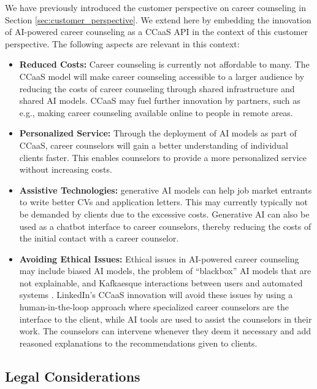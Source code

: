 We have previously introduced the customer perspective on career counseling in Section \ref{sec:customer_perspective}.
We extend here by embedding the innovation of AI-powered career counseling as a CCaaS API in the context of this 
customer perspective. The following aspects are relevant in this context:

\begin{itemize}
    \item \textbf{Reduced Costs:} Career counseling is currently not affordable to many. The CCaaS model
        will make career counseling accessible to a larger audience by reducing the costs of career
        counseling through shared infrastructure and shared AI models. CCaaS may fuel further innovation by 
        partners, such as e.g., making career counseling available online to people in remote areas.
    \item \textbf{Personalized Service:} Through the deployment of AI models as part of CCaaS, career counselors 
        will gain a better understanding of individual clients faster. This enables counselors to provide
        a more personalized service without increasing costs.
    \item \textbf{Assistive Technologies:} generative AI models can help job market entrants to write better CVs
        and application letters. This may currently typically not be demanded by clients due to the excessive costs.
        Generative AI can also be used as a chatbot interface to career counselors, thereby reducing the costs
        of the initial contact with a career counselor.
    \item \textbf{Avoiding Ethical Issues:} Ethical issues in AI-powered career counseling may include biased AI
        models, the problem of ``blackbox'' AI models that are not explainable, and Kafkaesque interactions between
        users and automated systems \citep{kaserAIpoweredCareerCounseling2023}. LinkedIn's CCaaS innovation will avoid 
        these issues by using a human-in-the-loop approach where specialized career counselors are the interface 
        to the client, while AI tools are used to assist the counselors in their work. The counselors can intervene
        whenever they deem it necessary and add reasoned explanations to the recommendations given to clients.
\end{itemize}


\subsection{Legal Considerations}


